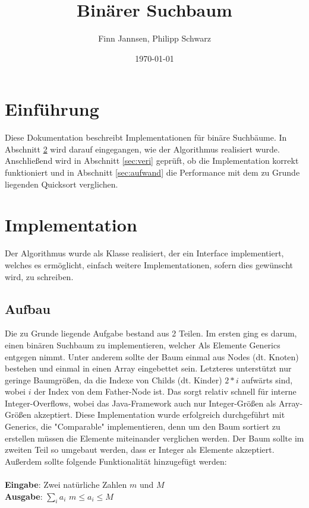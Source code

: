 \documentclass[11pt]{scrartcl}
\title{Binärer Suchbaum}
\author{Finn Jannsen, Philipp Schwarz}
\date{\today{}}
\begin{document}
\maketitle

\tableofcontents

\section{Einführung}
	\label{sec:einfuehrung}
	
	Diese Dokumentation beschreibt Implementationen für binäre Suchbäume.
	In Abschnitt \ref{sec:implementation} wird darauf eingegangen, wie der Algorithmus realisiert wurde.
	Anschließend wird in Abschnitt \ref{sec:veri} geprüft, ob die Implementation korrekt funktioniert 
	und in Abschnitt \ref{sec:aufwand} die Performance mit dem zu Grunde liegenden Quicksort verglichen.

\section{Implementation}
	\label{sec:implementation}
	
	Der Algorithmus wurde als Klasse realisiert, der ein Interface implementiert, welches es ermöglicht, einfach weitere Implementationen, sofern dies gewünscht wird, zu schreiben.
	
	\subsection{Aufbau}
		\label{sec:codeStruc}
		
		Die zu Grunde liegende Aufgabe bestand aus 2 Teilen. Im ersten ging es darum, einen binären Suchbaum zu implementieren, welcher Als Elemente Generics entgegen nimmt.
		Unter anderem sollte der Baum einmal aus Nodes (dt. Knoten) bestehen und einmal in einen Array eingebettet sein. Letzteres unterstützt nur geringe Baumgrößen, da die Indexe von Childs (dt. Kinder) $2*i$ aufwärts sind, wobei $i$ der Index von dem Father-Node ist. 
		Das sorgt relativ schnell für interne Integer-Overflows, wobei das Java-Framework auch nur Integer-Größen als Array-Größen akzeptiert.
		Diese Implementation wurde erfolgreich durchgeführt mit Generics, die "Comparable" implementieren, denn um den Baum sortiert zu erstellen müssen die Elemente miteinander verglichen werden.
		Der Baum sollte im zweiten Teil so umgebaut werden, dass er Integer als Elemente akzeptiert. Außerdem sollte folgende Funktionalität hinzugefügt werden:\\\\
		\textbf{Eingabe}: Zwei natürliche Zahlen $m$ und $M$\\
		\textbf{Ausgabe}: $\sum_{i}a_i$ $m \leq a_i \leq M$\\
\end{document}
